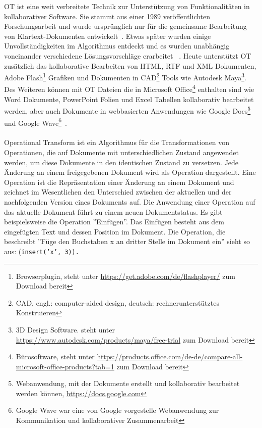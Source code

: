\def \maya { 3D Design Software. steht unter \url{https://www.autodesk.com/products/maya/free-trial} zum Download bereit}
\def \flash { Browserplugin, steht unter \url{https://get.adobe.com/de/flashplayer/} zum Download bereit}
\def \cad { CAD, engl.: computer-aided design, deutsch: rechnerunterstütztes Konstruieren}
\def \gdocs { Webanwendung, mit der Dokumente erstellt und kollaborativ bearbeitet werden können, \url{https://docs.google.com}}
\def \gwave { Google Wave war eine von Google vorgestelle Webanwendung zur Kommunikation und kollaborativer Zusammenarbeit}
\def \msoffice { Bürosoftware, steht unter \url{https://products.office.com/de-de/compare-all-microsoft-office-products?tab=1} zum Download bereit}
%
\gls{OT} ist eine weit verbreitete Technik zur Unterstützung von Funktionalitäten in \gls{kollaborativ}er Software.
Sie stammt aus einer 1989 veröffentlichten Forschungsarbeit und wurde ursprünglich nur für die gemeinsame Bearbeitung von Klartext-Dokumenten entwickelt~\cite{ot_paper}. Etwas später wurden einige Unvollständigkeiten im Algorithmus entdeckt und es wurden unabhängig voneinander verschiedene Lösungsvorschläge erarbeitet ~\cite{ot-later}.
Heute unterstützt \gls{OT} zusätzlich das \gls{kollaborativ}e Bearbeiten von \gls{HTML}, RTF und XML Dokumenten, Adobe Flash\footnote{\flash} Grafiken und Dokumenten in CAD\footnote{\cad} Tools wie Autodesk Maya\footnote{\maya}.
Des Weiteren können mit \gls{OT} Dateien die in Microsoft Office\footnote{\msoffice} enthalten sind wie Word Dokumente, PowerPoint Folien und Excel Tabellen kollaborativ bearbeitet werden, aber auch Dokumente in webbasierten Anwendungen wie Google Docs\footnote{\gdocs} und Google Wave\footnote{\gwave}~\cite{ot-faq}.\\\\
%
%
Operational Transform ist ein Algorithmus für die Transformationen von Operationen, die auf Dokumente mit unterschiedlichen Zustand angewendet werden, um diese Dokumente in den identischen Zustand zu versetzen.
Jede Änderung an einem freigegebenen Dokument wird als Operation dargestellt.
Eine Operation ist die Repräsentation einer Änderung an einem Dokument und zeichnet im Wesentlichen den Unterschied zwischen der aktuellen und der nachfolgenden Version eines Dokuments auf.
Die Anwendung einer Operation auf das aktuelle Dokument führt zu einem neuen Dokumentstatus.
Es gibt beispielsweise die Operation ''Einfügen''. 
Das Einfügen besteht aus dem eingefügten Text und dessen Position im Dokument. Die Operation, die beschreibt ''Füge den Buchstaben x an dritter Stelle im Dokument ein'' sieht so aus: (\tt{insert('x', 3)}).
